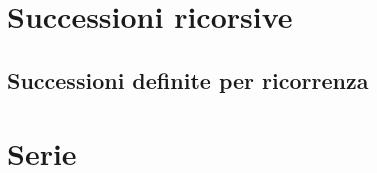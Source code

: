 \documentclass[a4paper,12pt]{report} %
\begin{document}
\chapter{Successioni ricorsive}

    \section{Successioni definite per ricorrenza}
    
    


%

\chapter{Serie}

    

    
\end{document}
